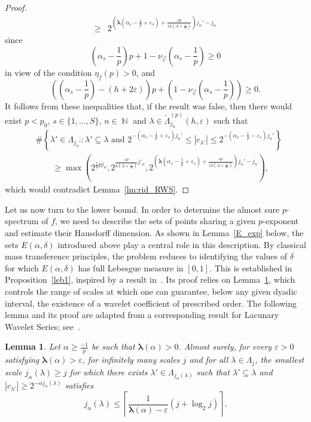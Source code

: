 \documentclass[a4paper,11pt,oneside]{article}
\DeclareMathOperator{\N}{\mathbb{N}}
\newcommand{\ccint}[1]{\left[{#1}\right]}
\newcommand{\modu}[1]{\left\vert{#1}\right\vert}
\theoremstyle{definition}
\theoremstyle{plain}
\newtheorem{lemma}[defi]{Lemma}
\begin{document}
\begin{proof}
\begin{align*}
        \geq & 2^{\left(\bm{\lambda}\left(\alpha_s-\frac{1}{p}+\varepsilon_s\right)+\frac{\varepsilon p}{12\left(A+\frac{1}{m}\right)}\right)j_n'-j_n}
    \end{align*}
    since
    \[
    \left(\alpha_s-\frac{1}{p}\right)p+1-\nu_{\vec{c}}\left(\alpha_s-\frac{1}{p}\right) \geq 0
    \]
    in view of the condition $\eta_f(p)>0$, and
    \[
    \left(\left(\alpha_s-\frac{1}{p}\right)-(h+2\varepsilon)\right)p+\left(1-\nu_{\vec{c}}\left(\alpha_s-\frac{1}{p}\right)\right) \geq 0.
    \]
    It follows from these inequalities that, if the result was false, then there would exist $p<p_0$, $s\in\{1,\ldots,S\}$, $n\in\N$ and $\lambda\in\widetilde{\Lambda}_{j_n}^{(p)}(h,\varepsilon)$ such that 
    \begin{align*}
        & \#\left\{\lambda'\in\Lambda_{j_n'}:\lambda'\subseteq\lambda \text{ and }2^{-\left(\alpha_s-\frac{1}{p}+\varepsilon_s\right)j_n'} \leq \modu{c_{\lambda'}} \leq 2^{-\left(\alpha_s-\frac{1}{p}-\varepsilon_s\right)j_n'}\right\} \\
        & \qquad \geq \max\left(2^{\frac{\varepsilon}{6}pj_n}, 2^{\frac{\varepsilon p}{6\left(A+\frac{1}{m}\right)}j'_n}, 2^{\left(\bm{\lambda}\left(\alpha_s-\frac{1}{p}+\varepsilon_s\right)+\frac{\varepsilon p}{12\left(A+\frac{1}{m}\right)}\right)j_n'-j_n}\right),
    \end{align*}
    which would contradict Lemma~\ref{lm:rid_RWS}.
\end{proof}



\medskip


Let us now turn to the lower bound. In order to determine the almost sure $p$-spectrum of $f$, we need to describe the sets of points sharing a given $p$-exponent and estimate their Hausdorff dimension. As shown in Lemma~\ref{E_exp} below, the sets $E(\alpha,\delta)$ introduced above play a central role in this description. By classical mass transference principles, the problem reduces to identifying the values of $\delta$ for which $E(\alpha,\delta)$ has full Lebesgue measure in $\ccint{0,1}$. This is established in Proposition~\ref{leb1}, inspired by a result in~\cite{RWS}. Its proof relies on Lemma~\ref{j_alpha}, which controls the range of scales at which one can guarantee, below any given dyadic interval, the existence of a wavelet coefficient of prescribed order. The following lemma and its proof are adapted from a corresponding result for Lacunary Wavelet Series; see~\cite{lacunaryCantor}.


\begin{lemma}\label{j_alpha}
Let $\alpha\geq\frac{-1}{p}$ be such that $\bm{\lambda}(\alpha)>0$. Almost surely, for every $\varepsilon>0$ satisfying $\bm{\lambda}(\alpha)>\varepsilon$, for infinitely many scales $j$ and for all $\lambda\in\Lambda_j$, the smallest scale $j_\alpha(\lambda)\geq j$ for which there exists $\lambda'\in\Lambda_{j_\alpha(\lambda)}$ such that $\lambda'\subseteq\lambda$ and $\modu{c_{\lambda'}}\geq 2^{-\alpha j_\alpha(\lambda)}$ satisfies
\[
j_{\alpha}(\lambda)\leq \left\lceil\frac{1}{\bm{\lambda}(\alpha)-\varepsilon}(j+\log_2j)\right\rceil.
\]
\end{lemma}
\end{document}
